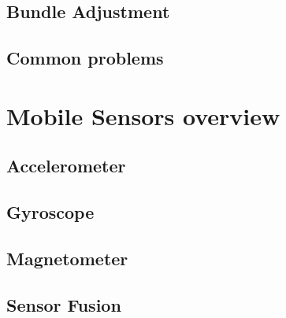 \subsection{Bundle Adjustment}
\subsection{Common problems}

\section{Mobile Sensors overview}
\subsection{Accelerometer}
\subsection{Gyroscope}
\subsection{Magnetometer}
\subsection{Sensor Fusion}


